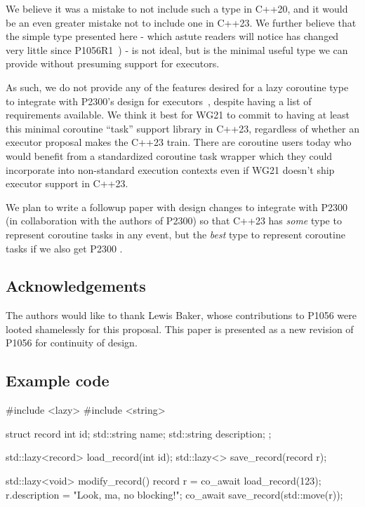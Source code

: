 We believe it was a mistake to not include such a type in C++20,
and it would be an even greater mistake not to include one in C++23.
We further believe that the simple type presented here
- which astute readers will notice
has changed very little since P1056R1~\cite{P1056R1}) -
is not ideal, but is the minimal useful type we can provide
without presuming support for executors.

As such, we do not provide any of the features
desired for a lazy coroutine type to integrate with
P2300's design for executors~\cite{P2300R3},
despite having a list of requirements available.
We think it best for WG21 to commit to having at least this minimal
coroutine ``task'' support library in C++23,
regardless of whether an executor proposal makes the C++23 train.
There are coroutine users today who would benefit
from a standardized coroutine task wrapper
which they could incorporate into non-standard execution contexts
even if WG21 doesn't ship executor support in C++23.

We plan to write a followup paper with design changes to integrate
 with P2300 (in collaboration with the authors of P2300)
so that C++23 has \emph{some} type to represent coroutine tasks in any event,
but the \emph{best} type to represent coroutine tasks if we also get
P2300 .

\subsection{Acknowledgements}

The authors would like to thank Lewis Baker,
whose contributions to P1056 \cite{P1056R1}
were looted shamelessly for this proposal.
This paper is presented as a new revision of
P1056 for continuity of design.

\subsection{Example code}

\begin{codeblock}
#include <lazy>
#include <string>

struct record {
  int id;
  std::string name;
  std::string description;
};

std::lazy<record> load_record(int id);
std::lazy<> save_record(record r);

std::lazy<void> modify_record() {
  record r = co_await load_record(123);
  r.description = "Look, ma, no blocking!";
  co_await save_record(std::move(r));
}
\end{codeblock}

